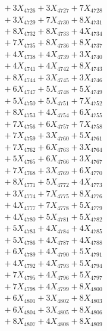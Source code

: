 \documentclass[a4paper,10pt]{article}
\begin{document}
{\begin{align}
&\;  + 3 X_{4726} + 3 X_{4727} + 7 X_{4728} \\[0.3ex]
&\;  + 3 X_{4729} + 7 X_{4730} + 8 X_{4731} \\[0.3ex]
&\;  + 8 X_{4732} + 8 X_{4733} + 4 X_{4734} \\[0.3ex]
&\;  + 7 X_{4735} + 8 X_{4736} + 8 X_{4737} \\[0.3ex]
&\;  + 4 X_{4738} + 4 X_{4739} + 3 X_{4740} \\[0.3ex]
&\;  + 4 X_{4741} + 4 X_{4742} + 8 X_{4743} \\[0.3ex]
&\;  + 8 X_{4744} + 3 X_{4745} + 3 X_{4746} \\[0.3ex]
&\;  + 6 X_{4747} + 5 X_{4748} + 5 X_{4749} \\[0.5ex]\allowbreak
&\;  + 5 X_{4750} + 5 X_{4751} + 7 X_{4752} \\[0.3ex]
&\;  + 8 X_{4753} + 4 X_{4754} + 6 X_{4755} \\[0.3ex]
&\;  + 7 X_{4756} + 6 X_{4757} + 7 X_{4758} \\[0.3ex]
&\;  + 7 X_{4759} + 3 X_{4760} + 5 X_{4761} \\[0.3ex]
&\;  + 7 X_{4762} + 6 X_{4763} + 3 X_{4764} \\[0.3ex]
&\;  + 5 X_{4765} + 6 X_{4766} + 3 X_{4767} \\[0.3ex]
&\;  + 7 X_{4768} + 3 X_{4769} + 6 X_{4770} \\[0.3ex]
&\;  + 8 X_{4771} + 5 X_{4772} + 4 X_{4773} \\[0.3ex]
&\;  + 3 X_{4774} + 7 X_{4775} + 8 X_{4776} \\[0.3ex]
&\;  + 4 X_{4777} + 7 X_{4778} + 5 X_{4779} \\[0.5ex]\allowbreak
&\;  + 4 X_{4780} + 5 X_{4781} + 5 X_{4782} \\[0.3ex]
&\;  + 5 X_{4783} + 4 X_{4784} + 4 X_{4785} \\[0.3ex]
&\;  + 5 X_{4786} + 4 X_{4787} + 4 X_{4788} \\[0.3ex]
&\;  + 6 X_{4789} + 4 X_{4790} + 5 X_{4791} \\[0.3ex]
&\;  + 4 X_{4792} + 4 X_{4793} + 5 X_{4794} \\[0.3ex]
&\;  + 7 X_{4795} + 4 X_{4796} + 5 X_{4797} \\[0.3ex]
&\;  + 7 X_{4798} + 4 X_{4799} + 8 X_{4800} \\[0.3ex]
&\;  + 6 X_{4801} + 3 X_{4802} + 8 X_{4803} \\[0.3ex]
&\;  + 6 X_{4804} + 3 X_{4805} + 8 X_{4806} \\[0.3ex]
&\;  + 8 X_{4807} + 4 X_{4808} + 8 X_{4809} \\[0.5ex]\allowbreak

\end{align}}
\end{document}
